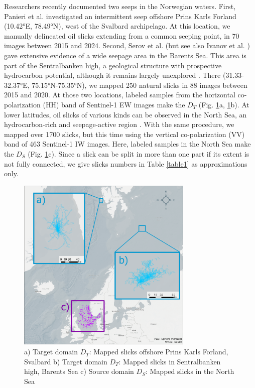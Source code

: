 \documentclass[journal]{IEEEtran}
\begin{document}
Researchers recently documented two seeps in the Norwegian waters. First, Panieri et al. \cite{panieriArcticNaturalOil2024} investigated an intermittent seep offshore Prins Karls Forland 
(10.42°E, 78.49°N), west of the Svalbard archipelago. At this location, we manually delineated oil slicks extending from a common seeping point, in 70 images between 2015 and 2024.
Second, Serov et al. \cite{serovWidespreadNaturalMethane2023} (but see also Ivanov et al. \cite{ivanovSearchDetectionNatural2020}) gave extensive evidence of a wide seepage area in the Barents Sea. 
This area is part of the Sentralbanken high, a geological structure with prospective hydrocarbon potential, although it remains largely unexplored \cite{lundschienNorthBarentsComposite2025}. 
There (31.33-32.37°E, 75.15°N-75.35°N), we mapped 250 natural slicks in 88 images between 2015 and 2020.
At those two locations, labeled samples from the horizontal co-polarization (HH) band of Sentinel-1 EW images make the $\mathit{D}_T$ (Fig. \ref{figure1}a, \ref{figure1}b). 
At lower latitudes, oil slicks of various kinds can be observed in the North Sea, an hydrocarbon-rich and seepage-active region \cite{juddSeabedFluidFlow2009,hovlandSeabedPockmarksSeepages1988}. 
With the same procedure, we mapped over 1700 slicks, but this time using the vertical co-polarization (VV) band of 463 Sentinel-1 IW images. Here, labeled samples in the North Sea make the $\mathit{D}_S$ (Fig. \ref{figure1}c).
Since a slick can be split in more than one part if its extent is not fully connected, we give slicks numbers in Table \ref{table1} as approximations only.
\begin{figure}[!t]
    \centering
    \includegraphics[width=3.3in]{figures/layout2.png} %
    \caption{a) Target domain \( \mathit{D}_T \): Mapped slicks offshore Prins Karls Forland, Svalbard \quad b) Target domain \( \mathit{D}_T \): Mapped slicks in Sentralbanken high, Barents Sea \quad 
    c) Source domain \( \mathit{D}_S \): Mapped slicks in the North Sea}
    \label{figure1}
\end{figure}
\end{document}
